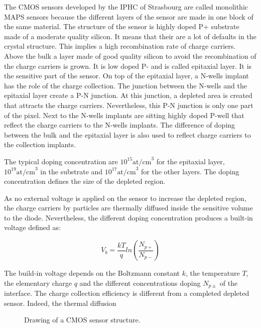     The \gls{CMOS} sensors developed by the IPHC of Strasbourg are called monolithic \gls{MAPS} sensors because the different layers of the sensor are made in one block of the same material.
    The structure of the sensor is highly doped P+ substrate made of a moderate quality silicon. 
    It means that their are a lot of defaults in the crystal structure.
    This implies a high recombination rate of charge carriers.
    Above the bulk a layer made of good quality silicon to avoid the recombination of the charge carriers is grown.
    It is low doped P- and is called epitaxial layer. 
    It is the sensitive part of the sensor. 
    On top of the epitaxial layer, a N-wells implant has the role of the charge collection.
    The junction between the N-wells and the epitaxial layer create a P-N junction.
    At this junction, a depleted area is created that attracts the charge carriers.
    Nevertheless, this P-N junction is only one part of the pixel.
    Next to the N-wells implants are sitting highly doped P-well that reflect the charge carriers to the N-wells implants. 
    The difference of doping between the bulk and the epitaxial layer is also used to reflect charge carriers to the collection implants.

    The typical doping concentration are $10^{15} \text{at/cm}^3$ for the epitaxial layer, $10^{19} \text{at/cm}^3$ in the substrate and $10^{17} \text{at/cm}^3$ for the other layers.
    The doping concentration defines the size of the depleted region.

    As no external voltage is applied on the sensor to increase the depleted region, the charge carriers by particles are thermally diffused inside the sensitive volume to the diode.
    Nevertheless, the different doping concentration produces a built-in voltage defined as: 

    \begin{equation}
      V_b = \frac{kT}{q}ln\left( \frac{N_{p+}}{N_{p-}}\right)
    \end{equation}
    
    The build-in voltage depends on the Boltzmann constant $k$, the temperature $T$, the elementary charge $q$ and the different concentrations doping $N_{p\pm}$ of the interface.
    The charge collection efficiency is different from a completed depleted sensor. 
    Indeed, the thermal diffusion 

    \begin{figure}
      \caption{Drawing of a CMOS sensor structure.}
    \end{figure}

